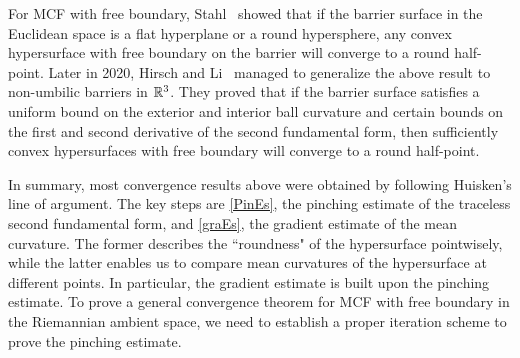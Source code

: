 For MCF with free boundary, Stahl~\cite{stahl_convergence_1996,stahl_regularity_1996} showed that if the barrier surface in the Euclidean space is a flat hyperplane or a round hypersphere, any convex hypersurface with free boundary on the barrier will converge to a round half-point. Later in 2020, Hirsch and Li~\cite{hirsch2020contracting} managed to generalize the above result to non-umbilic barriers in $\mathbb{R}^3$. They proved that if the barrier surface satisfies a uniform bound on the exterior and interior ball curvature and certain bounds on the first and second derivative of the second fundamental form, then sufficiently convex hypersurfaces with free boundary will converge to a round half-point.

In summary, most convergence results above were obtained by following Huisken's line of argument. The key steps are \autoref{PinEs}, the pinching estimate of the traceless second fundamental form, and \autoref{graEs}, the gradient estimate of the mean curvature. The former describes the ``roundness" of the hypersurface pointwisely, while the latter enables us to compare mean curvatures of the hypersurface at different points. In particular, the gradient estimate is built upon the pinching estimate. To prove a general convergence theorem for MCF with free boundary in the Riemannian ambient space, we need to establish a proper iteration scheme to prove the pinching estimate.




\chapterend

